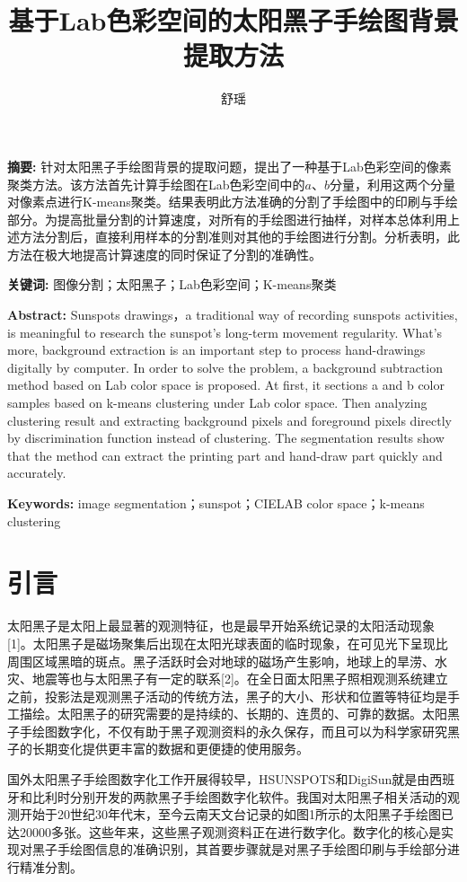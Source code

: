 \documentclass[UTF8,a4paper,twoside]{ctexart}
\title{基于Lab色彩空间的太阳黑子手绘图背景提取方法}
\author{舒瑶}
\date{}
\begin{document}
\maketitle

\textbf{摘要: }针对太阳黑子手绘图背景的提取问题，提出了一种基于Lab色彩空间的像素聚类方法。该方法首先计算手绘图在Lab色彩空间中的$a$、$b$分量，利用这两个分量对像素点进行K-means聚类。结果表明此方法准确的分割了手绘图中的印刷与手绘部分。为提高批量分割的计算速度，对所有的手绘图进行抽样，对样本总体利用上述方法分割后，直接利用样本的分割准则对其他的手绘图进行分割。分析表明，此方法在极大地提高计算速度的同时保证了分割的准确性。

\textbf{关键词: }图像分割；太阳黑子；Lab色彩空间；K-means聚类

\textbf{Abstract: }Sunspots drawings，a traditional way of recording sunspots activities, is meaningful to research the sunspot's long-term movement regularity. What's more, background extraction is an important step to process hand-drawings digitally by computer. In order to solve the problem, a background subtraction method based on Lab color space is proposed. At first, it sections a and b color samples based on k-means clustering under Lab color space. Then analyzing clustering result and extracting background pixels and foreground pixels directly by discrimination function instead of clustering. The segmentation results show that the method can extract the printing part and hand-draw part quickly and accurately.

\textbf{Keywords: }image segmentation；sunspot；CIELAB color space；k-means clustering

\section{引言}
太阳黑子是太阳上最显著的观测特征，也是最早开始系统记录的太阳活动现象[1]。太阳黑子是磁场聚集后出现在太阳光球表面的临时现象，在可见光下呈现比周围区域黑暗的斑点。黑子活跃时会对地球的磁场产生影响，地球上的旱涝、水灾、地震等也与太阳黑子有一定的联系[2]。在全日面太阳黑子照相观测系统建立之前，投影法是观测黑子活动的传统方法，黑子的大小、形状和位置等特征均是手工描绘。太阳黑子的研究需要的是持续的、长期的、连贯的、可靠的数据。太阳黑子手绘图数字化，不仅有助于黑子观测资料的永久保存，而且可以为科学家研究黑子的长期变化提供更丰富的数据和更便捷的使用服务。

国外太阳黑子手绘图数字化工作开展得较早，HSUNSPOTS和DigiSun就是由西班牙和比利时分别开发的两款黑子手绘图数字化软件。我国对太阳黑子相关活动的观测开始于20世纪30年代末，至今云南天文台记录的如图1所示的太阳黑子手绘图已达20000多张。这些年来，这些黑子观测资料正在进行数字化。数字化的核心是实现对黑子手绘图信息的准确识别，其首要步骤就是对黑子手绘图印刷与手绘部分进行精准分割。
\end{document}
